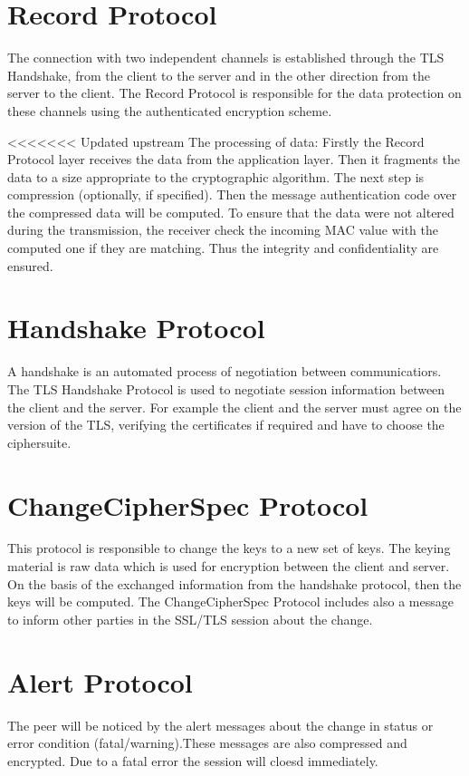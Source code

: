 \section{Record Protocol}
\label{sec:record_protocol}

The connection with two independent channels is established through the TLS Handshake, from the client to the server and in the other direction from the server to the client. The Record Protocol is responsible for the data protection on these channels using the authenticated encryption scheme.

<<<<<<< Updated upstream
The processing of data:              
Firstly the Record Protocol layer receives the data from the application layer. Then it fragments the data to a size appropriate to the cryptographic algorithm. 
The next step is compression (optionally, if specified). Then the message authentication code over the compressed data will be computed.
To ensure that the data were not altered during the transmission, the receiver check the incoming MAC value with the computed one if they are matching. Thus the integrity and confidentiality are ensured.
\cite{ms:Record}

\section{Handshake Protocol}
\label{sec:handshake_protocol}
 A handshake is an automated process of negotiation between communicatiors. The TLS Handshake Protocol is used to negotiate session information between the client and the server. For example the client and the server must agree on the version of the TLS, verifying the certificates if required and have to choose the ciphersuite. 

\cite{ms:overview}
\cite{ms:handshake}

\section{ChangeCipherSpec Protocol}
\label{sec:changeciphfer_protocol}
This protocol is responsible to change the keys to a new set of keys. 
The keying material is raw data which is used for encryption between the client and server. On the basis of the exchanged information from the handshake protocol, then the keys will be computed.
The ChangeCipherSpec Protocol includes also a message to inform other parties in the SSL/TLS session about the change.   \cite{ms:overview}


\section{Alert Protocol}
\label{sec:alert_protocol}
The peer will be noticed by the alert messages about the change in status or error condition (fatal/warning).These messages are also compressed and encrypted. Due to a fatal error the session will cloesd immediately. 

